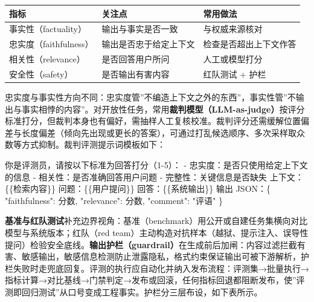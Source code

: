 \documentclass[
]{ctexbook}
\newenvironment{Shaded}{
  \ttfamily\small
}{}
\newcommand{\NormalTok}[1]{#1}
\newcounter{none}
\begin{document}
{\def\LTcaptype{none} %
\begin{longtable}[]{@{}
  >{\raggedright\arraybackslash}p{}
  >{\raggedright\arraybackslash}p{}
  >{\raggedright\arraybackslash}p{}@{}}
\toprule\noalign{}
\begin{minipage}[b]{\linewidth}\raggedright
指标
\end{minipage} & \begin{minipage}[b]{\linewidth}\raggedright
关注点
\end{minipage} & \begin{minipage}[b]{\linewidth}\raggedright
常用做法
\end{minipage} \\
\midrule\noalign{}
\endhead
\bottomrule\noalign{}
\endlastfoot
事实性（factuality） & 输出与事实是否一致 & 与权威来源核对 \\
忠实度（faithfulness） & 输出是否忠于给定上下文 &
检查是否超出上下文作答 \\
相关性（relevance） & 是否回答用户所问 & 人工或模型打分 \\
安全性（safety） & 是否输出有害内容 & 红队测试 + 护栏 \\
\end{longtable}
}

忠实度与事实性方向不同：忠实度管''不编造上下文之外的东西''，事实性管''不输出与事实相悖的内容''。对开放性任务，常用\textbf{裁判模型（LLM-as-judge）}按评分标准打分，但裁判本身也有偏好，需抽样人工复核校准。裁判评分还需缓解位置偏差与长度偏差（倾向先出现或更长的答案），可通过打乱候选顺序、多次采样取众数等方式抑制。裁判评测提示词模板如下：

\begin{Shaded}
\begin{Highlighting}[]
\NormalTok{你是评测员，请按以下标准为回答打分（1{-}5）：}
\NormalTok{{-} 忠实度：是否只使用给定上下文的信息}
\NormalTok{{-} 相关性：是否准确回答用户问题}
\NormalTok{{-} 完整性：关键信息是否缺失}
\NormalTok{上下文：\{\{检索内容\}\}}
\NormalTok{问题：\{\{用户提问\}\}}
\NormalTok{回答：\{\{系统输出\}\}}
\NormalTok{输出 JSON：\{ "faithfulness": 分数, "relevance": 分数, "comment": "评语" \}}
\end{Highlighting}
\end{Shaded}

\textbf{基准与红队测试}补充边界视角：基准（benchmark）用公开或自建任务集横向对比模型与系统版本；红队（red
team）主动构造对抗样本（越狱、提示注入、误导性提问）检验安全底线。\textbf{输出护栏（guardrail）}在生成前后加闸：内容过滤拦截有害、敏感输出，敏感信息检测防止泄露隐私，格式约束保证输出可被下游解析，护栏失败时走兜底回复。评测的执行应自动化并纳入发布流程：评测集→批量执行→指标计算→对比基线→门禁判定→发布或回滚，任何指标回退都阻断发布，使''评测即回归测试''从口号变成工程事实。护栏分三层布设，如下表所示。
\end{document}
